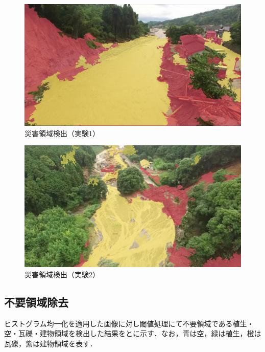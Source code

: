 \documentclass[../Thesis]{subfiles}
\begin{document}
\begin{figure}[tbp]
	\centering
	\includegraphics[width=12cm]{img/detection1.png}
	\caption{災害領域検出（実験1）}
	\label{img12}
\end{figure}
\begin{figure}[tbp]
	\centering
	\includegraphics[width=12cm]{img/detection2.png}
	\caption{災害領域検出（実験2）}
	\label{img13}
\end{figure}

\subsection{不要領域除去}
\label{rejection}
ヒストグラム均一化を適用した画像に対し閾値処理にて不要領域である植生・空・瓦礫・建物領域を検出した結果をとに示す．なお，青は空，緑は植生，橙は瓦礫，紫は建物領域を表す．
\end{document}
